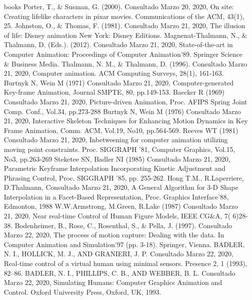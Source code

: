 \documentclass[a4paper,12pt]{report}
\begin{document}
\begin{thebibliography} {books}
     Porter, T., \& Susman, G. (2000). Consultado Marzo 20, 2020, On site: Creating lifelike characters in pixar movies. Communications of the ACM, 43(1), 25.
     Johnston, O., \& Thomas, F. (1981). Consultado Marzo 21, 2020, The illusion of life: Disney animation New York: Disney Editions.
     Magnenat-Thalmann, N., \& Thalmann, D. (Eds.). (2012). Consultado Marzo 21, 2020, State-of-the-art in Computer Animation: Proceedings of Computer Animation’89. Springer Science \& Business Media.
     Thalmann, N. M., \& Thalmann, D. (1996). Consultado Marzo 21, 2020, Computer animation. ACM Computing Surveys, 28(1), 161-163.
     Burtnyk N, Wein M (1971) Consultado Marzo 21, 2020, Computer-generated Key-frame Animation, Journal SMPTE, 80, pp.149-153.
     Baecker R (1969) Consultado Marzo 21, 2020, Picture-driven Animation, Proc. AFIPS Spring Joint Comp. Conf., Vol.34, pp.273-288
     Burtnyk N, Wein M (1976) Consultado Marzo 21, 2020, Interactive Skeleton Techniques for Enhancing Motion Dynamics in Key Frame Animation, Comm. ACM, Vol.19, No10, pp.564-569.
     Reeves WT (1981) Consultado Marzo 21, 2020, Inbetweening for computer animation utilizing moving point constraints. Proc. SIGGRAPH '81, Computer Graphics, Vol.15, No3, pp.263-269
     Steketee SN, Badler NI (1985) Consultado Marzo 21, 2020, Parametric Keyframe Interpolation Incorporating Kinetic Adjustment and Phrasing Control, Proc. SIGGRAPH '85, pp. 255-262.
     Hong T.M., R.Laperriere, D.Thalmann, Consultado Marzo 21, 2020, A General Algorithm for 3-D Shape Interpolation in a Facet-Based Representation, Proc. Graphics Interface'88, Edmonton, 1988
     W.W.Armstrong, M.Green, R.Lake (1987) Consultado Marzo 21, 2020, Near real-time Control of Human Figure Models, IEEE CG\&A, 7( 6)28-38.
     Bodenheimer, B., Rose, C., Rosenthal, S., \& Pella, J. (1997). Consultado Marzo 22, 2020, The process of motion capture: Dealing with the data. In Computer Animation and Simulation’97 (pp. 3-18). Springer, Vienna.
     BADLER, N. I., HOLLICK, M. J., AND GRANIERI, J. P. Consultado Marzo 22, 2020, Real-time control of a virtual human using minimal sensors. Presence 2, 1 (1993), 82–86.
     BADLER, N. I., PHILLIPS, C. B., AND WEBBER, B. L. Consultado Marzo 22, 2020, Simulating Humans: Computer Graphics Animation and Control. Oxford University Press, Oxford, UK, 1993.

\end{thebibliography}
\end{document}
